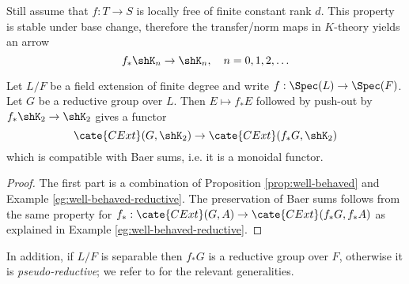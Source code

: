 \documentclass[a4paper,10pt]{article}
\begin{document}
Still assume that $f: T \to S$ is locally free of finite constant rank $d$. This property is stable under base change, therefore the transfer/norm maps in $K$-theory \cite[V.3.3.2]{Wei13} yields an arrow
\[ f_* \shK_n \to \shK_n, \quad n=0,1,2,\ldots \]

\begin{proposition}\label{prop:BD-restriction-Weil}
	Let $L/F$ be a field extension of finite degree and write $f: \Spec(L) \to \Spec(F)$. Let $G$ be a reductive group over $L$. Then $E \mapsto f_* E$ followed by push-out by $f_* \shK_2 \to \shK_2$ gives a functor
	\[ \cate{CExt}(G, \shK_2) \to \cate{CExt}(f_* G, \shK_2) \]
	which is compatible with Baer sums, i.e. it is a monoidal functor.
\end{proposition}
\begin{proof}
	The first part is a combination of Proposition \ref{prop:well-behaved} and Example \ref{eg:well-behaved-reductive}. The preservation of Baer sums follows from the same property for $f_*: \cate{CExt}(G,A) \to \cate{CExt}(f_* G, f_* A)$ as explained in Example \ref{eg:well-behaved-reductive}.
\end{proof}

In addition, if $L/F$ is separable then $f_* G$ is a reductive group over $F$, otherwise it is \emph{pseudo-reductive}; we refer to \cite[A.5]{CGP15} for the relevant generalities.
\end{document}
